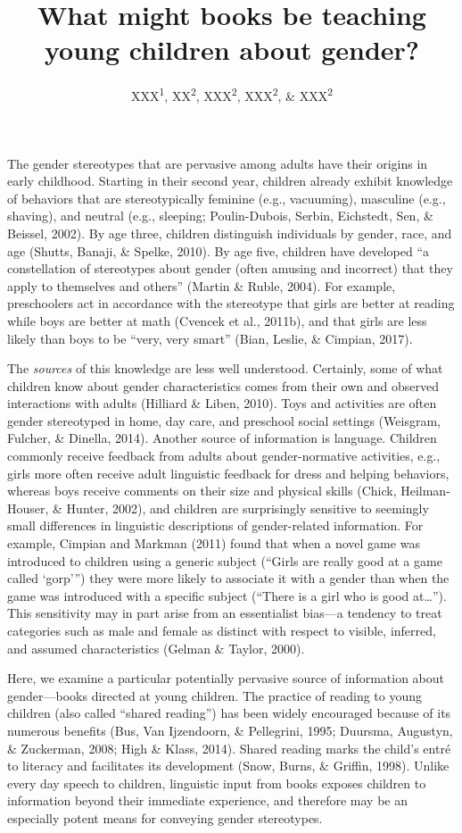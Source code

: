 \documentclass[english,,man,floatsintext]{apa6}
\title{What might books be teaching young children about gender?}
\author{XXX\textsuperscript{1}, XX\textsuperscript{2}, XXX\textsuperscript{2}, XXX\textsuperscript{2}, \& XXX\textsuperscript{2}}
\date{}
\affiliation{
\vspace{0.5cm}
\textsuperscript{1} XXX\\\textsuperscript{2} XXX}
\begin{document}
\maketitle

The gender stereotypes that are pervasive among adults have their origins in early childhood. Starting in their second year, children already exhibit knowledge of behaviors that are stereotypically feminine (e.g., vacuuming), masculine (e.g., shaving), and neutral (e.g., sleeping; Poulin-Dubois, Serbin, Eichstedt, Sen, \& Beissel, 2002). By age three, children distinguish individuals by gender, race, and age (Shutts, Banaji, \& Spelke, 2010). By age five, children have developed \enquote{a constellation of stereotypes about gender (often amusing and incorrect) that they apply to themselves and others} (Martin \& Ruble, 2004). For example, preschoolers act in accordance with the stereotype that girls are better at reading while boys are better at math (Cvencek et al., 2011b), and that girls are less likely than boys to be \enquote{very, very smart} (Bian, Leslie, \& Cimpian, 2017).

The \emph{sources} of this knowledge are less well understood. Certainly, some of what children know about gender characteristics comes from their own and observed interactions with adults (Hilliard \& Liben, 2010). Toys and activities are often gender stereotyped in home, day care, and preschool social settings (Weisgram, Fulcher, \& Dinella, 2014). Another source of information is language. Children commonly receive feedback from adults about gender-normative activities, e.g., girls more often receive adult linguistic feedback for dress and helping behaviors, whereas boys receive comments on their size and physical skills (Chick, Heilman-Houser, \& Hunter, 2002), and children are surprisingly sensitive to seemingly small differences in linguistic descriptions of gender-related information. For example, Cimpian and Markman (2011) found that when a novel game was introduced to children using a generic subject (\enquote{Girls are really good at a game called \enquote{gorp}}) they were more likely to associate it with a gender than when the game was introduced with a specific subject (\enquote{There is a girl who is good at\ldots{}}). This sensitivity may in part arise from an essentialist bias---a tendency to treat categories such as male and female as distinct with respect to visible, inferred, and assumed characteristics (Gelman \& Taylor, 2000).

Here, we examine a particular potentially pervasive source of information about gender---books directed at young children. The practice of reading to young children (also called \enquote{shared reading}) has been widely encouraged because of its numerous benefits (Bus, Van Ijzendoorn, \& Pellegrini, 1995; Duursma, Augustyn, \& Zuckerman, 2008; High \& Klass, 2014). Shared reading marks the child's entré to literacy and facilitates its development (Snow, Burns, \& Griffin, 1998). Unlike every day speech to children, linguistic input from books exposes children to information beyond their immediate experience, and therefore may be an especially potent means for conveying gender stereotypes.
\end{document}
